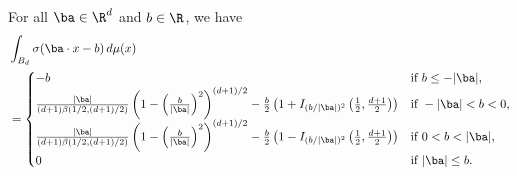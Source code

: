 \documentclass{amsart}[11pt]
\numberwithin{equation}{section}
\numberwithin{theorem}{section}
\begin{document}
\begin{lemma}
    For all $\ba \in \R^d$ and $b \in \R$, we have
    \begin{align*}
        &\int_{B_d} \sigma(\ba \cdot x - b) \, d\mu(x) \\
        &= 
        \begin{cases}
            -b & \text{if } b \leq -|\ba|, \\
            \frac{|\ba|}{(d + 1)\beta(1/2, (d+1)/2)} \left(1 - \left(\frac{b}{|\ba|}\right)^2\right)^{(d+1)/2} - \frac{b}{2}\left( 1 + I_{(b/|\ba|)^2}\left(\frac{1}{2}, \frac{d+1}{2}\right)\right) & \text{if } -|\ba| < b < 0, \\
            \frac{|\ba|}{(d + 1)\beta(1/2, (d+1)/2)} \left(1 - \left(\frac{b}{|\ba|}\right)^2\right)^{(d+1)/2} - \frac{b}{2} \left( 1 - I_{(b/|\ba|)^2}\left(\frac{1}{2}, \frac{d+1}{2}\right)\right) & \text{if } 0 < b < |\ba|, \\
            0 & \text{if } |\ba| \leq b.
        \end{cases}
    \end{align*}
\end{lemma}
\end{document}
